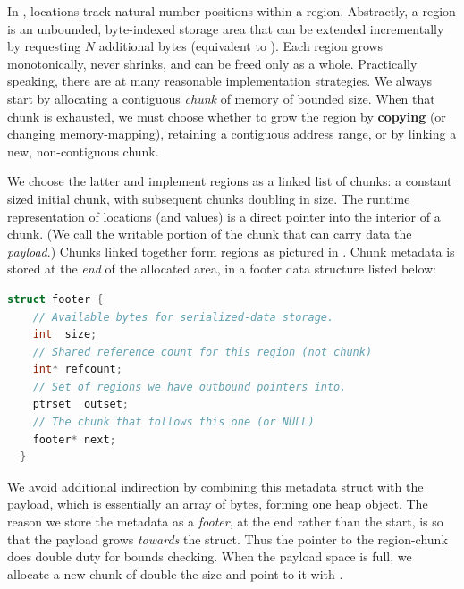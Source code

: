 In \ourcalc, locations track natural number positions within a region.
Abstractly, a region is an unbounded, byte-indexed storage area that can be
extended incrementally by requesting $N$ additional bytes (equivalent to
).
%
Each region grows monotonically, never shrinks, and can be
freed only as a whole.
%
Practically speaking, there are at many reasonable implementation strategies.
%
We always start by allocating a contiguous {\em chunk} of memory of bounded
size.  When that chunk is exhausted, we must choose whether to grow the
region by {\bf copying} (or changing memory-mapping), retaining a contiguous
address range, or by linking a new, non-contiguous chunk.



We choose the latter and implement regions as a linked list of chunks: a
constant sized initial chunk, with subsequent chunks doubling in size.
%
The runtime representation of locations (and  values)
is a direct pointer into the interior of a chunk.
(We call the writable portion of the chunk that can carry data the {\em payload}.)
Chunks linked together form regions as pictured in
.  Chunk metadata is stored at the \emph{end} of the
allocated area, in a footer data structure listed below:
%
\begin{lstlisting}[language=C++]
  struct footer {
    // Available bytes for serialized-data storage.
    int  size;
    // Shared reference count for this region (not chunk)
    int* refcount;
    // Set of regions we have outbound pointers into.
    ptrset  outset;
    // The chunk that follows this one (or NULL)
    footer* next;
  }
\end{lstlisting}
We avoid additional indirection by combining this metadata struct with the
payload, which is essentially an array of bytes, forming one heap object.
The reason we store the metadata as a \emph{footer}, at the end rather than the
start, is so that the payload grows \emph{towards} the struct.  Thus the pointer
to the region-chunk does double duty for bounds checking.  When the payload
space is full, we allocate a new chunk of double the size and point to it with
.

